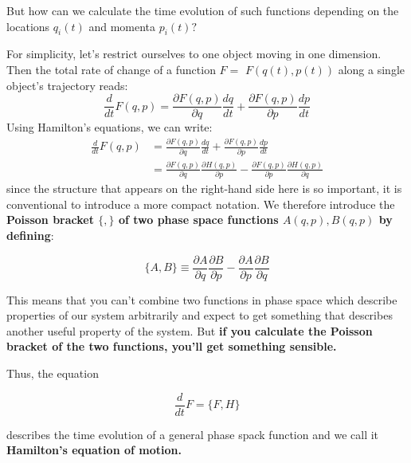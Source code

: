 \begin{mybox}
But how can we calculate the time evolution of such functions depending on the locations $q_{i}(t)$ and momenta $p_{i}(t) ?$
\end{mybox}
For simplicity, let's restrict ourselves to one object moving in one dimension. Then the total rate of change of a function $F=$ $F(q(t), p(t))$ along a single object's trajectory reads:
$$
\frac{d}{d t} F(q, p)=\frac{\partial F(q, p)}{\partial q} \frac{d q}{d t}+\frac{\partial F(q, p)}{\partial p} \frac{d p}{d t}
$$
Using Hamilton's equations, we can write:
$$
\begin{aligned}
\frac{d}{d t} F(q, p) &=\frac{\partial F(q, p)}{\partial q} \frac{d q}{d t}+\frac{\partial F(q, p)}{\partial p} \frac{d p}{d t} \\
&=\frac{\partial F(q, p)}{\partial q} \frac{\partial H(q, p)}{\partial p}-\frac{\partial F(q, p)}{\partial p} \frac{\partial H(q, p)}{\partial q}
\end{aligned}
$$
since the structure that appears on the right-hand side here is so important, it is conventional to introduce a more compact notation. We therefore introduce the \textbf{Poisson bracket $\{,\}$ of two phase space functions $A(q, p), B(q, p)$ by defining}:
\begin{qt}
    \begin{equation}
        \{A, B\} \equiv \frac{\partial A}{\partial q} \frac{\partial B}{\partial p}-\frac{\partial A}{\partial p} \frac{\partial B}{\partial q}
    \end{equation}
\end{qt}
This means that you can’t combine two functions in phase space which describe properties of our system arbitrarily and expect to get something that describes another useful property of
the system. But \textbf{if you calculate the Poisson bracket of the two functions, you’ll get something sensible.} 

Thus, the equation
\begin{qt}
    \begin{equation}
\frac{d}{d t} F=\{F, H\}
\end{equation}
\end{qt}
describes the time evolution of a general phase spack function and we call it \textbf{Hamilton's equation of motion.}

